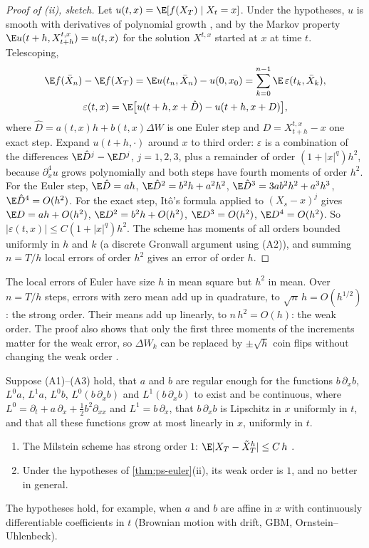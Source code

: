 \begin{proof}[Proof of (ii), sketch]
Let $u(t,x)=\E[f(X_T)\mid X_t=x]$. Under the hypotheses, $u$ is smooth with derivatives of
polynomial growth \citep{talay-tubaro}, and by the Markov property
$\E u(t+h,X^{t,x}_{t+h})=u(t,x)$ for the solution $X^{t,x}$ started at $x$ at time $t$.
Telescoping,
\begin{gather*}
  \E f(\bar X_n)-\E f(X_T)=\E u(t_n,\bar X_n)-u(0,x_0)=\sum_{k=0}^{n-1}\E\,\varepsilon(t_k,\bar X_k),\\
  \varepsilon(t,x)=\E\big[u(t+h,x+\hat D)-u(t+h,x+D)\big],
\end{gather*}
where $\hat D=a(t,x)h+b(t,x)\Delta W$ is one Euler step and $D=X^{t,x}_{t+h}-x$ one exact
step. Expand $u(t+h,\cdot)$ around $x$ to third order: $\varepsilon$ is a combination of the
differences $\E\hat D^j-\E D^j$, $j=1,2,3$, plus a remainder of order $(1+|x|^q)h^2$,
because $\partial_x^4u$ grows polynomially and both steps have fourth moments of order
$h^2$. For the Euler step,
$\E\hat D=ah$, $\E\hat D^2=b^2h+a^2h^2$, $\E\hat D^3=3ab^2h^2+a^3h^3$, $\E\hat D^4=O(h^2)$.
For the exact step, It\^o's formula applied to $(X_s-x)^j$ gives $\E D=ah+O(h^2)$,
$\E D^2=b^2h+O(h^2)$, $\E D^3=O(h^2)$, $\E D^4=O(h^2)$. So
$|\varepsilon(t,x)|\le C(1+|x|^q)h^2$. The scheme has moments of all orders bounded uniformly
in $h$ and $k$ (a discrete Gronwall argument using (A2)), and summing $n=T/h$ local errors of
order $h^2$ gives an error of order $h$.
\end{proof}

The local errors of Euler have size $h$ in mean square but $h^2$ in mean. Over $n=T/h$ steps,
errors with zero mean add up in quadrature, to $\sqrt n\,h=O(h^{1/2})$: the strong order. Their
means add up linearly, to $n\,h^2=O(h)$: the weak order. The proof also shows that only the
first three moments of the increments matter for the weak error, so $\Delta W_k$ can be replaced
by $\pm\sqrt h$ coin flips without changing the weak order \citep[Section~14.1]{kloeden-platen}.

\begin{theorem}[Milstein]\label{thm:ps-milstein}
Suppose (A1)--(A3) hold, that $a$ and $b$ are regular enough for the functions $b\,\partial_xb$,
$L^0a$, $L^1a$, $L^0b$, $L^0(b\,\partial_xb)$ and $L^1(b\,\partial_xb)$ to exist and be
continuous, where $L^0=\partial_t+a\,\partial_x+\frac12b^2\partial_{xx}$ and
$L^1=b\,\partial_x$, that $b\,\partial_xb$ is Lipschitz in $x$ uniformly in $t$, and that all
these functions grow at most linearly in $x$, uniformly in $t$.
\begin{enumerate}[label=(\roman*)]
  \item The Milstein scheme has strong order $1$: $\E|X_T-\tilde X^h_T|\le C\,h$
    \citep[Theorem~10.3.5, a case of Theorem~10.6.3]{kloeden-platen}.
  \item Under the hypotheses of \cref{thm:ps-euler}(ii), its weak order is $1$, and no
    better in general.
\end{enumerate}
The hypotheses hold, for example, when $a$ and $b$ are affine in $x$ with continuously
differentiable coefficients in $t$ (Brownian motion with drift, GBM, Ornstein--Uhlenbeck).
\end{theorem}

